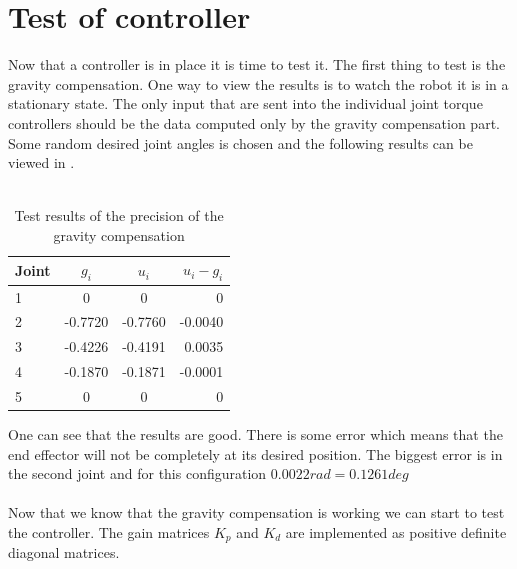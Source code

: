 \section{Test of controller}
Now that a controller is in place it is time to test it. The first thing to test is the gravity compensation. One way to view the results is to watch the robot it is in a stationary state. The only input that are sent into the individual joint torque controllers should be the data computed only by the gravity compensation part. Some random desired joint angles is chosen and the following results can be viewed in .\\\\
\begin{table}[htbp]
\centering
\caption{Test results of the precision of the gravity compensation}
\label{table:gravity}
    \begin{tabular}{l c c r}
        \toprule
        Joint  &  $g_i$ & $u_i$ & $u_i-g_i$\\
        \midrule
        1 & 0 & 0 & 0\\
        2 & -0.7720  & -0.7760  & -0.0040 \\
        3 &-0.4226 & -0.4191 & 0.0035 \\
        4 & -0.1870 &-0.1871 & -0.0001\\
        5 & 0 & 0 & 0\\
        \bottomrule
    \end{tabular}
\end{table}
One can see that the results are good. There is some error which means that the end effector will not be completely at its desired position. The biggest error is in the second joint and for this configuration $0.0022 rad = 0.1261 deg$\\\\
Now that we know that the gravity compensation is working we can start to test the controller. The gain matrices $K_p$ and $K_d$ are implemented as positive definite diagonal matrices.\\\\
\def\picsSiz{1.08}
